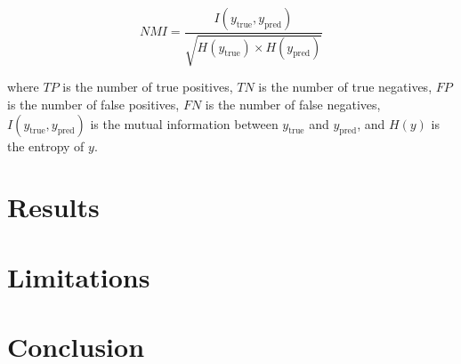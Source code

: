 \documentclass[sigconf]{acmart}
\begin{document}
\[ NMI = \frac{I(y_{\text{true}}, y_{\text{pred}})}{\sqrt{H(y_{\text{true}}) \times H(y_{\text{pred}})}} \]

where $TP$ is the number of true positives, $TN$ is the number of true negatives, $FP$ is the number of false positives, $FN$ is the number of false negatives, $I(y_{\text{true}}, y_{\text{pred}})$ is the mutual information between $y_{\text{true}}$ and $y_{\text{pred}}$, and $H(y)$ is the entropy of $y$.

\section{Results}




\section{Limitations}




\section{Conclusion}






\end{document}
